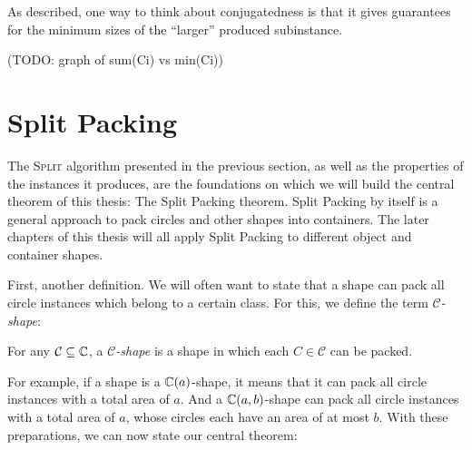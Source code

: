 \documentclass[a4paper,style=print,oneside,bibliography=totoc,nexus,lnum,extramargin]{tubsbook}
\begin{document}
As described, one way to think about conjugatedness is that it gives guarantees for the minimum sizes of the “larger” produced subinstance.

(TODO: graph of sum(Ci) vs min(Ci))



\section{Split Packing}

The \textsc{Split} algorithm presented in the previous section, as well as the properties of the instances it produces, are the foundations on which we will build the central theorem of this thesis: The Split Packing theorem. Split Packing by itself is a general approach to pack circles and other shapes into containers. The later chapters of this thesis will all apply Split Packing to different object and container shapes.

First, another definition. We will often want to state that a shape can pack all circle instances which belong to a certain class. For this, we define the term \emph{$\mathcal{C}$-shape}:

\begin{definition}
    For any $\mathcal{C} \subseteq \mathbb{C}$, a \emph{$\mathcal{C}$-shape} is a shape in which each $C \in \mathcal{C}$ can be packed.
\end{definition}

For example, if a shape is a $\mathbb{C}(a)$-shape, it means that it can pack all circle instances with a total area of $a$. And a $\mathbb{C}(a,b)$-shape can pack all circle instances with a total area of $a$, whose circles each have an area of at most $b$.
With these preparations, we can now state our central theorem:
\end{document}
